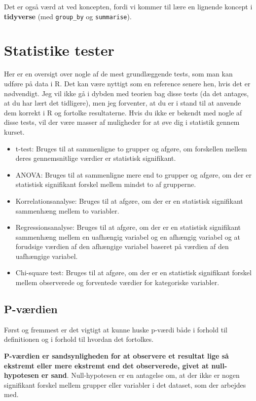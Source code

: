 \documentclass[
]{book}
\begin{document}
Det er også værd at ved koncepten, fordi vi kommer til lære en lignende koncept i \textbf{tidyverse} (med \texttt{group\_by} og \texttt{summarise}).

\section{Statistike tester}\label{statistike-tester}

Her er en oversigt over nogle af de mest grundlæggende tests, som man kan udføre på data i R. Det kan være nyttigt som en reference senere hen, hvis det er nødvendigt. Jeg vil ikke gå i dybden med teorien bag disse tests (da det antages, at du har lært det tidligere), men jeg forventer, at du er i stand til at anvende dem korrekt i R og fortolke resultaterne. Hvis du ikke er bekendt med nogle af disse tests, vil der være masser af muligheder for at øve dig i statistik gennem kurset.

\begin{itemize}
\item
  t-test: Bruges til at sammenligne to grupper og afgøre, om forskellen mellem deres gennemsnitlige værdier er statistisk signifikant.
\item
  ANOVA: Bruges til at sammenligne mere end to grupper og afgøre, om der er statistisk signifikant forskel mellem mindst to af grupperne.
\item
  Korrelationsanalyse: Bruges til at afgøre, om der er en statistisk signifikant sammenhæng mellem to variabler.
\item
  Regressionsanalyse: Bruges til at afgøre, om der er en statistisk signifikant sammenhæng mellem en uafhængig variabel og en afhængig variabel og at forudsige værdien af den afhængige variabel baseret på værdien af den uafhængige variabel.
\item
  Chi-square test: Bruges til at afgøre, om der er en statistisk signifikant forskel mellem observerede og forventede værdier for kategoriske variabler.
\end{itemize}

\subsection{P-værdien}\label{p-vuxe6rdien}

Først og fremmest er det vigtigt at kunne huske p-værdi både i forhold til definitionen og i forhold til hvordan det fortolkes.

\textbf{P-værdien er sandsynligheden for at observere et resultat lige så ekstremt eller mere ekstremt end det observerede, givet at null-hypotesen er sand}. Null-hypotesen er en antagelse om, at der ikke er nogen signifikant forskel mellem grupper eller variabler i det dataset, som der arbejdes med.
\end{document}
